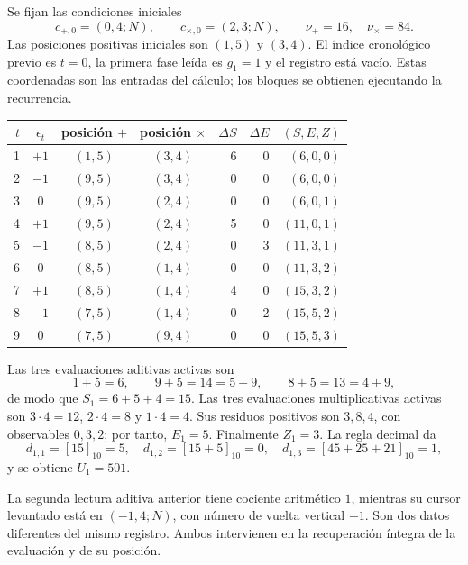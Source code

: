 Se fijan las condiciones iniciales
\[
 c_{+,0}=(0,4;N),\qquad c_{\times,0}=(2,3;N),
 \qquad \nu_+=16,\quad\nu_\times=84.
\]
Las posiciones positivas iniciales son \((1,5)\) y \((3,4)\). El índice
cronológico previo es \(t=0\), la primera fase leída es \(g_1=1\) y el
registro está vacío. Estas coordenadas son las entradas
del cálculo; los bloques se obtienen ejecutando la recurrencia.

\begin{tablacompleta}[htbp]
\caption{Primera ventana: lecturas previas y acumulación activa.}
\label{tpk:tabla-501}
\small
\begin{tabular}{@{}rcccrrr@{}}
\toprule
\(t\)&\(\epsilon_t\)&posición \(+\)&posición \(\times\)&
\(\Delta S\)&\(\Delta E\)&\((S,E,Z)\)\\
\midrule
1&\(+1\)&\((1,5)\)&\((3,4)\)&6&0&\((6,0,0)\)\\
2&\(-1\)&\((9,5)\)&\((3,4)\)&0&0&\((6,0,0)\)\\
3&0&\((9,5)\)&\((2,4)\)&0&0&\((6,0,1)\)\\
4&\(+1\)&\((9,5)\)&\((2,4)\)&5&0&\((11,0,1)\)\\
5&\(-1\)&\((8,5)\)&\((2,4)\)&0&3&\((11,3,1)\)\\
6&0&\((8,5)\)&\((1,4)\)&0&0&\((11,3,2)\)\\
7&\(+1\)&\((8,5)\)&\((1,4)\)&4&0&\((15,3,2)\)\\
8&\(-1\)&\((7,5)\)&\((1,4)\)&0&2&\((15,5,2)\)\\
9&0&\((7,5)\)&\((9,4)\)&0&0&\((15,5,3)\)\\
\bottomrule
\end{tabular}
\end{tablacompleta}

Las tres evaluaciones aditivas activas son
\[
 1+5=6,\qquad9+5=14=5+9,\qquad8+5=13=4+9,
\]
de modo que \(S_1=6+5+4=15\). Las tres evaluaciones multiplicativas activas
son \(3\cdot4=12\), \(2\cdot4=8\) y \(1\cdot4=4\). Sus residuos
positivos son \(3,8,4\), con observables \(0,3,2\); por tanto,
\(E_1=5\). Finalmente \(Z_1=3\). La regla decimal da
\[
 d_{1,1}=[15]_{10}=5,\quad
 d_{1,2}=[15+5]_{10}=0,\quad
 d_{1,3}=[45+25+21]_{10}=1,
\]
y se obtiene \(U_1=501\).

La segunda lectura aditiva anterior tiene cociente aritmético \(1\),
mientras su cursor levantado está en \((-1,4;N)\), con número de vuelta
vertical \(-1\). Son dos datos diferentes del mismo registro. Ambos
intervienen en la recuperación íntegra de la evaluación y de su posición.

